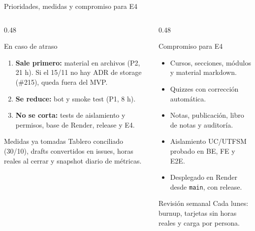 \begin{frame}{Prioridades, medidas y compromiso para E4}
\begin{columns}[T,onlytextwidth]
\begin{column}{0.48\textwidth}
\begin{block}{En caso de atraso}
\scriptsize
\begin{enumerate}
  \item \textbf{Sale primero:} material en archivos (P2, 21 h). Si el 15/11 no hay ADR de storage (\#215), queda fuera del MVP.
  \item \textbf{Se reduce:} bot y smoke test (P1, 8 h).
  \item \textbf{No se corta:} tests de aislamiento y permisos, base de Render, release y E4.
\end{enumerate}
\end{block}
\begin{block}{Medidas ya tomadas}
\scriptsize
Tablero conciliado (30/10), drafts convertidos en issues, horas reales al cerrar y snapshot diario de métricas.
\end{block}
\end{column}
\begin{column}{0.48\textwidth}
\begin{block}{Compromiso para E4}
\scriptsize
\begin{itemize}
  \item Cursos, secciones, módulos y material markdown.
  \item Quizzes con corrección automática.
  \item Notas, publicación, libro de notas y auditoría.
  \item Aislamiento UC/UTFSM probado en BE, FE y E2E.
  \item Desplegado en Render desde \texttt{main}, con release.
\end{itemize}
\end{block}
\begin{block}{Revisión semanal}
\scriptsize
Cada lunes: burnup, tarjetas sin horas reales y carga por persona.
\end{block}
\end{column}
\end{columns}
\end{frame}
